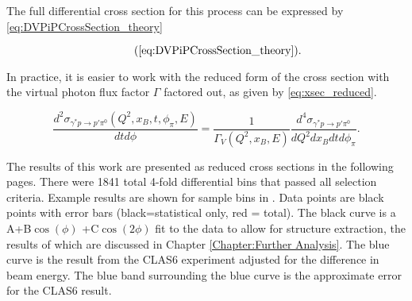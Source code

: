 The full differential cross section for this process can be expressed by \eqref{eq:DVPiPCrossSection_theory}

        \begin{equation*}
          \recallLabel{eq:DVPiPCrossSection_theory}.
        \end{equation*}

In practice, it is easier to work with the reduced form of the cross section with the virtual photon flux factor $\Gamma$ factored out, as given by \eqref{eq:xsec_reduced}.

 \begin{equation}\label{eq:xsec_reduced}
    \frac{d^2\sigma_{\gamma^*p \rightarrow p'\pi^0}(Q^2,x_B,t,\phi_{\pi},E)}{dtd\phi} = \frac{1}{\Gamma_V(Q^2,x_B,E)} \frac{d^4\sigma_{\gamma^*p \rightarrow p'\pi^0}}{dQ^2dx_Bdtd\phi_{\pi}}.
\end{equation}

The results of this work are presented as reduced cross sections in the following pages. There were 1841 total 4-fold differential bins that passed all selection criteria. Example results are shown for sample bins in . Data points are black points with error bars (black=statistical only, red = total). The black curve is a A+B$\cos(\phi)$ +C$\cos(2\phi)$ fit to the data to allow for structure extraction, the results of which are discussed in Chapter \ref{Chapter:Further Analysis}. The blue curve is the result from the CLAS6 experiment \parencite{Bedlinskiy2014ExclusiveCLAS} adjusted for the difference in beam energy. The blue band surrounding the blue curve is the approximate error for the CLAS6 result.


\iffalse
 \begin{equation}\label{xsec_red_full}
    \frac{d^2\sigma_{\gamma^*p \rightarrow p'\pi^0}}{dtd\phi} = \frac{1}{\Gamma_V(Q^2,x_B,E)} \frac{N(Q^2,x_B,t,\phi_{\pi})}{\Lumi_{int}\Delta Q^2\Delta x_B\Delta t\Delta \phi} \frac{1}{\epsilon_{ACC} \delta_{RC} \delta_{Norm} Br(\pi^0 \rightarrow \gamma \gamma)}
\end{equation}

\fi

